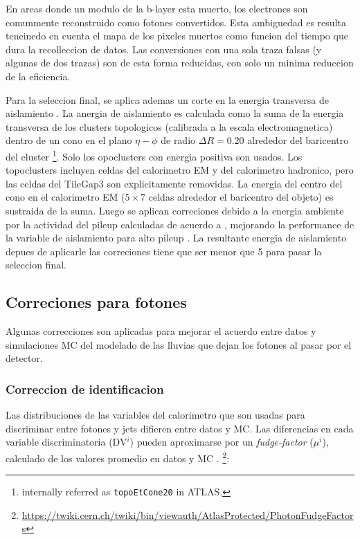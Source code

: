 En areas donde un modulo de la b-layer esta muerto, los electrones son
comunmente reconstruido como fotones convertidos. Esta ambiguedad
es resulta teneinedo en cuenta el mapa de los pixeles muertos como
funcion del tiempo que dura la recolleccion de datos. Las conversiones
con una sola traza falsas (y algunas de dos trazas) son de esta forma
reducidas, con solo un minima reduccion de la eficiencia.

Para la seleccion final, se aplica ademas un corte en la energia
transversa de aislamiento {\etiso}. La anergia de aislamiento
es calculada como la suma de la energia transversa de los clusters
topologicos (calibrada a la escala electromagnetica) dentro de un
cono en el plano $\eta-\phi$ de radio $\Delta R = 0.20$ alrededor
del baricentro del cluster \footnote{internally referred as
  \texttt{topoEtCone20} in ATLAS.}.
Solo los opoclusters con energia positiva son usados. Los topoclusters
incluyen celdas del calorimetro EM y del calorimetro hadronico, pero
las celdas del TileGap3 son explicitamente removidas.
La energia del centro del cono en el calorimetro EM ($5\times7$ celdas alrededor el
baricentro del objeto) es sustraida de la suma. Luego se aplican correciones
debido a la energia ambiente por la actividad del pileup calculadas de acuerdo
a \cite{Hance:1379530}, mejorando la performance de la variable de aislamiento
para alto pileup \cite{Laplace:1444890}. La resultante energia de aislamiento
depues de aplicarle las correciones tiene que ser menor que 5 {\gev} para
pasar la seleccion final.

\subsection{Correciones para fotones}

Algunas correcciones son aplicadas para mejorar el acuerdo entre datos y
simulaciones MC del modelado de las lluvias que dejan los fotones al
pasar por el detector.

\subsubsection{Correccion de identificacion}

Las distribuciones de las variables del calorimetro que son usadas
para discriminar entre fotones y jets difieren entre datos y MC.
Las diferencias en cada variable discriminatoria (DV$^i$) pueden
aproximarse por un \emph{fudge-factor} ($\mu^i$), calculado de
los valores promedio en datos y MC \cite{ATLAS-CONF-2012-123}.
\footnote{\url{https://twiki.cern.ch/twiki/bin/viewauth/AtlasProtected/PhotonFudgeFactors}}:

